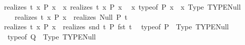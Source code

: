 \begin{isabellebody}
\isanewline
\ \ {\isachardoublequoteopen}{\isacharparenleft}{\kern0pt}realizes\ t\ {\isacharparenleft}{\kern0pt}{\isasymforall}x{\isachardot}{\kern0pt}\ P\ x{\isacharparenright}{\kern0pt}{\isacharparenright}{\kern0pt}\ {\isasymequiv}\ {\isacharparenleft}{\kern0pt}{\isasymforall}x{\isachardot}{\kern0pt}\ realizes\ {\isacharparenleft}{\kern0pt}t\ x{\isacharparenright}{\kern0pt}\ {\isacharparenleft}{\kern0pt}P\ x{\isacharparenright}{\kern0pt}{\isacharparenright}{\kern0pt}{\isachardoublequoteclose}\isanewline
\isanewline
\ \ {\isachardoublequoteopen}{\isacharparenleft}{\kern0pt}{\isasymlambda}x{\isachardot}{\kern0pt}\ typeof\ {\isacharparenleft}{\kern0pt}P\ x{\isacharparenright}{\kern0pt}{\isacharparenright}{\kern0pt}\ {\isasymequiv}\ {\isacharparenleft}{\kern0pt}{\isasymlambda}x{\isachardot}{\kern0pt}\ Type\ {\isacharparenleft}{\kern0pt}TYPE{\isacharparenleft}{\kern0pt}Null{\isacharparenright}{\kern0pt}{\isacharparenright}{\kern0pt}{\isacharparenright}{\kern0pt}\ {\isasymLongrightarrow}\isanewline
\ \ \ \ \ {\isacharparenleft}{\kern0pt}realizes\ t\ {\isacharparenleft}{\kern0pt}{\isasymexists}x{\isachardot}{\kern0pt}\ P\ x{\isacharparenright}{\kern0pt}{\isacharparenright}{\kern0pt}\ {\isasymequiv}\ {\isacharparenleft}{\kern0pt}realizes\ Null\ {\isacharparenleft}{\kern0pt}P\ t{\isacharparenright}{\kern0pt}{\isacharparenright}{\kern0pt}{\isachardoublequoteclose}\isanewline
\isanewline
\ \ {\isachardoublequoteopen}{\isacharparenleft}{\kern0pt}realizes\ t\ {\isacharparenleft}{\kern0pt}{\isasymexists}x{\isachardot}{\kern0pt}\ P\ x{\isacharparenright}{\kern0pt}{\isacharparenright}{\kern0pt}\ {\isasymequiv}\ {\isacharparenleft}{\kern0pt}realizes\ {\isacharparenleft}{\kern0pt}snd\ t{\isacharparenright}{\kern0pt}\ {\isacharparenleft}{\kern0pt}P\ {\isacharparenleft}{\kern0pt}fst\ t{\isacharparenright}{\kern0pt}{\isacharparenright}{\kern0pt}{\isacharparenright}{\kern0pt}{\isachardoublequoteclose}\isanewline
\isanewline
\ \ {\isachardoublequoteopen}{\isacharparenleft}{\kern0pt}typeof\ P{\isacharparenright}{\kern0pt}\ {\isasymequiv}\ {\isacharparenleft}{\kern0pt}Type\ {\isacharparenleft}{\kern0pt}TYPE{\isacharparenleft}{\kern0pt}Null{\isacharparenright}{\kern0pt}{\isacharparenright}{\kern0pt}{\isacharparenright}{\kern0pt}\ {\isasymLongrightarrow}\isanewline
\ \ \ {\isacharparenleft}{\kern0pt}typeof\ Q{\isacharparenright}{\kern0pt}\ {\isasymequiv}\ {\isacharparenleft}{\kern0pt}Type\ {\isacharparenleft}{\kern0pt}TYPE{\isacharparenleft}{\kern0pt}Null{\isacharparenright}{\kern0pt}{\isacharparenright}{\kern0pt}{\isacharparenright}{\kern0pt}\ {\isasymLongrightarrow}\isanewline

\end{isabellebody}
